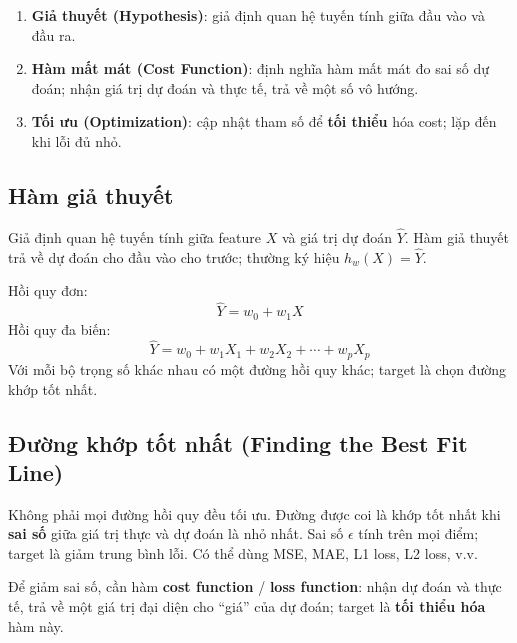 \begin{phuongphap}[title={Ba bước chính}]
\begin{enumerate}
  \item \textbf{Giả thuyết (Hypothesis)}: giả định quan hệ tuyến tính giữa đầu vào và đầu ra.
  \item \textbf{Hàm mất mát (Cost Function)}: định nghĩa hàm mất mát đo sai số dự đoán; nhận giá trị dự đoán và thực tế, trả về một số vô hướng.
  \item \textbf{Tối ưu (Optimization)}: cập nhật tham số để \textbf{tối thiểu} hóa cost; lặp đến khi lỗi đủ nhỏ.
\end{enumerate}
\end{phuongphap}

\subsection{Hàm giả thuyết}

\begin{dinhnghia}[title={Hàm giả thuyết $h_w(X)$}]
Giả định quan hệ tuyến tính giữa feature $X$ và giá trị dự đoán $\hat{Y}$.
Hàm giả thuyết trả về dự đoán cho đầu vào cho trước; thường ký hiệu $h_w(X) = \hat{Y}$.
\end{dinhnghia}

\begin{phuongphap}[title={Công thức}]
Hồi quy đơn:
\[
\hat{Y} = w_0 + w_1 X
\]
Hồi quy đa biến:
\[
\hat{Y} = w_0 + w_1 X_1 + w_2 X_2 + \cdots + w_p X_p
\]
Với mỗi bộ trọng số khác nhau có một đường hồi quy khác; target là chọn đường khớp tốt nhất.
\end{phuongphap}

\subsection{Đường khớp tốt nhất (Finding the Best Fit Line)}

\begin{phuongphap}[title={Tiêu chí đường tốt nhất}]
Không phải mọi đường hồi quy đều tối ưu.
Đường được coi là khớp tốt nhất khi \textbf{sai số} giữa giá trị thực và dự đoán là nhỏ nhất.
Sai số $\epsilon$ tính trên mọi điểm; target là giảm trung bình lỗi.
Có thể dùng MSE, MAE, L1 loss, L2 loss, v.v.
\end{phuongphap}


\begin{dongco}[title={Hàm mất mát}]
Để giảm sai số, cần hàm \textbf{cost function} / \textbf{loss function}: nhận dự đoán và thực tế, trả về một giá trị đại diện cho ``giá'' của dự đoán; target là \textbf{tối thiểu hóa} hàm này.
\end{dongco}

